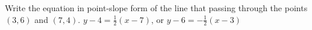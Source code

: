 {Write the equation in point-slope form of the line that passing through the points $(3,6)$ and $(7,4)$.}
{$y-4=\frac{1}{2}(x-7)$, or $y-6=-\frac{1}{2}(x-3)$}
